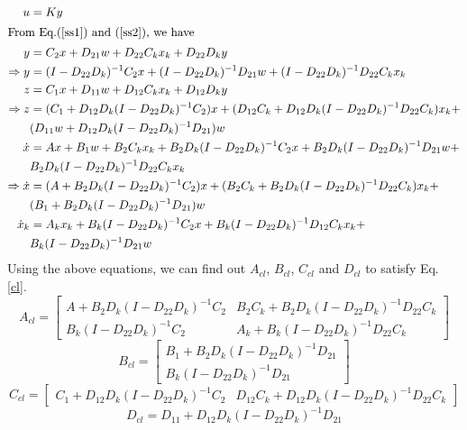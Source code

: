 \documentclass[a4paper,12pt]{article}
\begin{document}
		\\
		\begin{align*}
		u&=Ky \\
		\intertext{From Eq.(\ref{ss1}) and (\ref{ss2}), we have}
		y &= C_{2}x + D_{21}w+D_{22}C_{k}x_{k} + D_{22}D_{k}y\\
		\Rightarrow y &= (I-D_{22}D_{k})^{-1}C_{2}x + (I-D_{22}D_{k})^{-1}D_{21}w  + (I-D_{22}D_{k})^{-1}D_{22}C_{k}x_{k} \\
		z&=C_{1}x+D_{11}w+D_{12}C_{k}x_{k}+D_{12}D_{k}y\\
		\Rightarrow z&=(C_{1} + D_{12}D_{k}(I-D_{22}D_{k})^{-1}C_{2})x+ (D_{12}C_{k}+ D_{12}D_{k}(I-D_{22}D_{k})^{-1}D_{22}C_{k})x_{k} + \\& (D_{11}w+D_{12}D_{k}(I-D_{22}D_{k})^{-1}D_{21})w\\
		\dot{x}&=Ax+B_{1}w+B_{2}C_{k}x_{k} + B_{2}D_{k}(I-D_{22}D_{k})^{-1}C_{2}x+ B_{2}D_{k}(I-D_{22}D_{k})^{-1}D_{21}w + \\& B_{2}D_{k}(I-D_{22}D_{k})^{-1}D_{22}C_{k}x_{k}\\
		\Rightarrow \dot{x} &= (A+B_{2}D_{k}(I-D_{22}D_{k})^{-1}C_{2})x+(B_{2}C_{k}+ B_{2}D_{k}(I-D_{22}D_{k})^{-1}D_{22}C_{k})x_{k} + \\& (B_{1} + B_{2}D_{k}(I-D_{22}D_{k})^{-1}D_{21})w\\
		\dot{x}_{k}&=A_{k}x_{k} + B_{k}(I-D_{22}D_{k})^{-1}C_{2}x + B_{k}(I-D_{22}D_{k})^{-1}D_{12}C_{k}x_{k}+ \\&B_{k}(I-D_{22}D_{k})^{-1}D_{21}w
		\end{align*}
		Using the above equations, we can find out $A_{cl}$, $B_{cl}$, $C_{cl}$ and $D_{cl}$ to satisfy Eq. \ref{cl}. 
		\[
		A_{cl} = \begin{bmatrix}
		A + B_{2}D_{k}(I-D_{22}D_{k})^{-1}C_{2} & B_{2}C_{k} + B_{2}D_{k}(I-D_{22}D_{k})^{-1}D_{22}C_{k} \\
		B_{k}(I-D_{22}D_{k})^{-1}C_{2} & A_{k} + B_{k}(I-D_{22}D_{k})^{-1}D_{22}C_{k}
		\end{bmatrix}
		\]
		\[
		B_{cl} = \begin{bmatrix}
		B_{1}+B_{2}D_{k}(I-D_{22}D_{k})^{-1}D_{21} \\
		B_{k}(I-D_{22}D_{k})^{-1}D_{21}
		\end{bmatrix}
		\]
		\[
		C_{cl} = \begin{bmatrix} 
		C_{1} + D_{12}D_{k}(I-D_{22}D_{k})^{-1}C_{2} & D_{12}C_{k} + D_{12}D_{k}(I-D_{22}D_{k})^{-1}D_{22}C_{k}
		\end{bmatrix}
		\]
		\[
		D_{cl}=D_{11}+D_{12}D_{k}(I-D_{22}D_{k})^{-1}D_{21}
		\]
		
\end{document}
